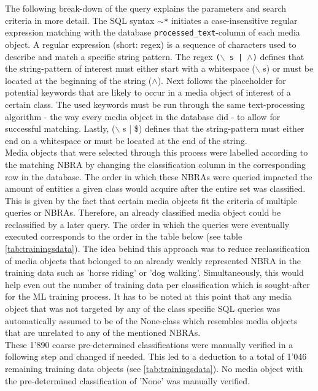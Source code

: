 The following break-down of the query explains the parameters and search criteria in more detail. The SQL syntax \texttt{$\sim$*} initiates a case-insensitive regular expression matching with the database \texttt{processed\_text}-column of each media object. A regular expression (short: regex) is a sequence of characters used to describe and match a specific string pattern. The regex \texttt{($\backslash$ s | $\wedge$)} defines that the string-pattern of interest must either start with a whitespace ($\backslash$ s) or must be located at the beginning of the string ($\wedge$). Next follows the placeholder for potential keywords that are likely to occur in a media object of interest of a certain class. The used keywords must be run through the same text-processing algorithm - the way every media object in the database did - to allow for successful matching. Lastly, ($\backslash$ s | \$) defines that the string-pattern must either end on a whitespace or must be located at the end of the string.\\ 
Media objects that were selected through this process were labelled according to the matching NBRA by changing the classification column in the corresponding row in the database. The order in which these NBRAs were queried impacted the amount of entities a given class would acquire after the entire set was classified. This is given by the fact that certain media objects fit the criteria of multiple queries or NBRAs. Therefore, an already classified media object could be reclassified by a later query. The order in which the queries were eventually executed corresponds to the order in the table below (see table \ref{tab:trainingsdata}). The idea behind this approach was to reduce reclassification of media objects that belonged to an already weakly represented NBRA in the training data such as 'horse riding' or 'dog walking'. Simultaneously, this would help even out the number of training data per classification which is sought-after for the ML training process. It has to be noted at this point that any media object that was not targeted by any of the class specific SQL queries was automatically assumed to be of the None-class which resembles media objects that are unrelated to any of the mentioned NBRAs.\\
These 1'890 coarse pre-determined classifications were manually verified in a following step and changed if needed. This led to a deduction to a total of 1'046 remaining training data objects (see \ref{tab:trainingsdata}). No media object with the pre-determined classification of 'None' was manually verified.\\
